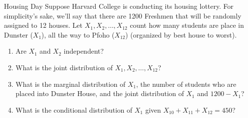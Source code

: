 \documentclass[11.5pt]{article}
\begin{document}
\begin{comment}
\begin{solution}{4} 
We want $P(L = l, M = m)$ for all pairs $(l, m)$. Let's consider the three cases.
\begin{enumerate}[label=\arabic*.]
\item $l > m$: $P(L = l, M = m) = 0$
\item $l < m$:
\begin{align*}
P(L = l, M = m) &= P(X = l, Y = m) + P(X = m, Y = l) \\
&= 2 P(X = l, Y = m) & \textrm{by symmetry} \\
&= 2 P(X = l) P(Y = m) & \textrm{by independence of $X$ and $Y$} \\
&= 2 \frac{e^{-\lambda} \lambda^l}{l!} \frac{e^{-\lambda} \lambda^m}{m!}
\end{align*}
\item $l = m$:
\begin{align*}
P(L = l, M = m) &= P(L = l, M = l) \\
&= P(X = l, Y = l) \\
&= \paren{\frac{e^{-\lambda} \lambda^l}{l!}}^2
\end{align*}
\end{enumerate}
This fully specifies the joint PMF of $L$ and $M$. No, $L$ and $M$ are not independent. Knowning the value of $L$ constrains the possible values of $M$ and vice versa.
\end{solution}

\end{comment}


\begin{exercise}{Housing Day}
Suppose Harvard College is conducting its housing lottery. For simplicity's sake, we'll say that there are 1200 Freshmen that will be randomly assigned to 12 houses. Let $X_1, X_2, \ldots, X_{12}$ count how many students are place in Dunster ($X_1$), all the way to Pfoho ($X_{12}$) (organized by best house to worst).
\begin{enumerate}
\item Are $X_1$ and $X_2$ independent?
\item What is the joint distribution of $X_1, X_2, \ldots, X_{12}$?
\item What is the marginal distribution of $X_1$, the number of students who are placed into Dunster House, and the joint distribution of $X_1$ and $1200 - X_1$?
\item What is the conditional distribution of $X_1$ given $X_{10} + X_{11} + X_{12} = 450$?
\end{enumerate}
\end{exercise}
\end{document}
